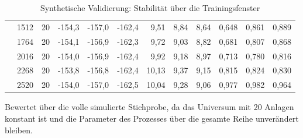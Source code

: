 \begin{table}[htbp]
{\begin{tabular}{lrrrrrrrrrrr}
     & 1512 & 20 & -154,3 & -157,0 & -162,4 & 9,51 & 8,84 & 8,64 & 0,648 & 0,861 & 0,889 \\
     & 1764 & 20 & -154,1 & -156,9 & -162,3 & 9,72 & 9,03 & 8,82 & 0,681 & 0,807 & 0,868 \\
     & 2016 & 20 & -154,0 & -156,9 & -162,4 & 9,92 & 9,18 & 8,97 & 0,713 & 0,780 & 0,816 \\
     & 2268 & 20 & -153,8 & -156,8 & -162,4 & 10,13 & 9,37 & 9,15 & 0,815 & 0,824 & 0,830 \\
     & 2520 & 20 & -154,0 & -157,0 & -162,5 & 10,04 & 9,28 & 9,06 & 0,977 & 0,982 & 0,964 \\
    \bottomrule
  \end{tabular}
  }
  \caption{Synthetische Validierung: Stabilität über die Trainingsfenster}
  \label{tab:synth_stabilitaet}
  \begin{minipage}{\linewidth}\vspace{0.4em}\centering\footnotesize
  Bewertet über die volle simulierte Stichprobe, da das Universum mit 20 Anlagen konstant ist und die Parameter des Prozesses über die gesamte Reihe unverändert bleiben.
  \end{minipage}
\end{table}
